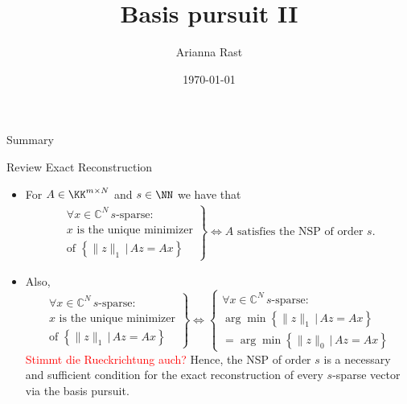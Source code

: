 \documentclass[11pt]{beamer}
\author[Autor]{Arianna Rast}
\title{Basis pursuit II}
\institute[]{LMU Munich}
\date{\today}
\newcommand{\CC}{\mathbb{C}}
\begin{document}
\begin{frame}
\titlepage
\end{frame}

\begin{frame}{Summary}
\tableofcontents 
\end{frame}

\begin{frame}{Review Exact Reconstruction}
\begin{itemize}
	\item For \(A\in \KK^{m\times N}\) and \(s\in \NN\) we have that
	\begin{align*}
	\left.\begin{array}{c}
		\forall x\in \CC^N\,s\text{-sparse}:\\
		x\text{ is the unique minimizer} \\  \text{of }
		\left\{\|z\|_1\,\big|\, Az=Ax\right\}
	\end{array}\right\}
\iff  A\text{ satisfies the NSP of order }s.
\end{align*}
\item Also, 
\[\left.\begin{array}{c}
		\forall x\in \CC^N\,s\text{-sparse}:\\
		x\text{ is the unique minimizer} \\  \text{of }
		\left\{\|z\|_1\,\big|\, Az=Ax\right\}
	\end{array}\right\} \iff \left\{\begin{array}{c}
		\forall x\in \CC^N\,s\text{-sparse}:\\
		\arg\min\left\{\|z\|_1\,\big|\,Az=Ax\right\}\\
		=\arg\min\left\{\|z\|_0\,\big|\,Az=Ax\right\}
	\end{array}\right.

\]
\textcolor{red}{Stimmt die Rueckrichtung auch?}
Hence, the NSP of order \(s\) is a necessary and sufficient condition for the exact reconstruction of every \(s\)-sparse vector via the basis pursuit.
\end{itemize}
\end{frame}
\end{document}
